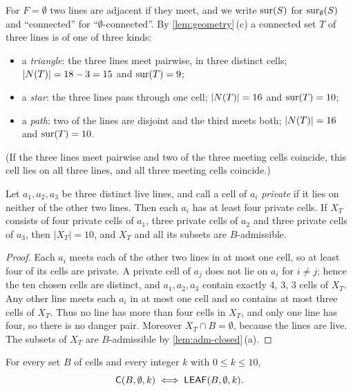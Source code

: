 For $F=\emptyset$ two lines are adjacent if they meet, and we write $\operatorname{sur}(S)$ for $\operatorname{sur}_\emptyset(S)$ and
``connected'' for ``$\emptyset$-connected''. By \cref{lem:geometry}\,(c) a connected set $T$ of three
lines is of one of three kinds:
\begin{itemize}
\item a \emph{triangle}: the three lines meet pairwise, in three distinct cells; $|N(T)|=18-3=15$ and
      $\operatorname{sur}(T)=9$;
\item a \emph{star}: the three lines pass through one cell; $|N(T)|=16$ and $\operatorname{sur}(T)=10$;
\item a \emph{path}: two of the lines are disjoint and the third meets both; $|N(T)|=16$ and
      $\operatorname{sur}(T)=10$.
\end{itemize}
(If the three lines meet pairwise and two of the three meeting cells coincide, this cell lies on all
three lines, and all three meeting cells coincide.)

\begin{lemma}\label{lem:433}
Let $a_1,a_2,a_3$ be three distinct live lines, and call a cell of $a_i$ \emph{private} if it lies on
neither of the other two lines. Then each $a_i$ has at least four private cells. If $X_T$ consists of
four private cells of $a_1$, three private cells of $a_2$ and three private cells of $a_3$, then
$|X_T|=10$, and $X_T$ and all its subsets are $B$-admissible.
\end{lemma}

\begin{proof}
Each $a_i$ meets each of the other two lines in at most one cell, so at least four of its cells are
private. A private cell of $a_j$ does not lie on $a_i$ for $i\ne j$; hence the ten chosen cells are
distinct, and $a_1,a_2,a_3$ contain exactly $4$, $3$, $3$ cells of $X_T$. Any other line meets each $a_i$
in at most one cell and so contains at most three cells of $X_T$. Thus no line has more than four cells
in $X_T$, and only one line has four, so there is no danger pair. Moreover $X_T\cap B=\emptyset$, because
the lines are live. The subsets of $X_T$ are $B$-admissible by \cref{lem:adm-closed}\,(a).
\end{proof}

\begin{proposition}[$\LEAF$ is exact for $F=\emptyset$, $k\le 10$]\label{prop:leaf-equals-C}
For every set $B$ of cells and every integer $k$ with $0\le k\le 10$,
\[
  \mathsf{C}(B,\emptyset,k)\iff\mathsf{LEAF}(B,\emptyset,k).
\]
\end{proposition}

